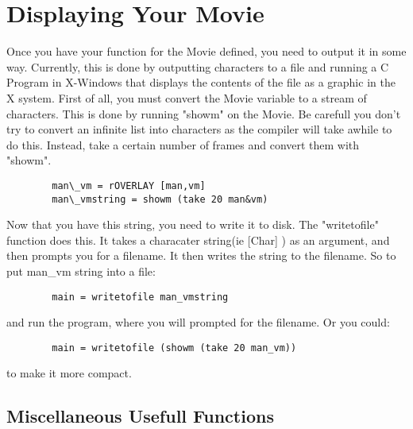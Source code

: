 \section{Displaying Your Movie}

	Once you have your function for the Movie defined, you need to output
it in some way. Currently, this is done by outputting characters to a file and
running a C Program in X-Windows that displays the contents of the file
as a graphic in the X system. First of all, you must convert the
Movie variable to a stream of characters. This is done by running 
"showm" on the Movie. Be carefull you don't try to convert an infinite list
into characters as the compiler will take awhile to do this. Instead, take
a certain number of frames and convert them with "showm".
\begin{verbatim}
        man\_vm = rOVERLAY [man,vm]
        man\_vmstring = showm (take 20 man&vm)
\end{verbatim}
  Now that you have this string, you need to write it to disk. The 
"writetofile" function does this. It takes a characater string(ie [Char] )
as an argument, and then prompts you for a filename. It then writes the
string to the filename. So to put man\_vm string into a file:
\begin{verbatim}
        main = writetofile man_vmstring
\end{verbatim}
and run the program, where you will prompted for the filename. Or you could:
\begin{verbatim}
        main = writetofile (showm (take 20 man_vm))
\end{verbatim}
to make it more compact.


\subsection{Miscellaneous Usefull Functions}

